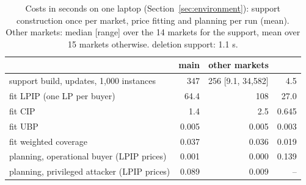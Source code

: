 
\begin{table}[t]
  \centering
  \footnotesize
  \setlength{\tabcolsep}{3pt}
  \caption{Costs in seconds on one laptop (Section~\ref{sec:environment}): support construction once per market, price fitting and planning per run (mean). Other markets: median [range] over the 14 markets for the support, mean over 15 markets otherwise. \tpch{} deletion support: 1.1 s.}
  \label{tab:costs}
  \begin{tabular}{@{}p{}rrr@{}}
    \toprule
    & main & other markets & \tpch{} \\
    \midrule
    support build, \qirana{} updates, 1,000 instances & 347 & 256 [9.1, 34,582] & 4.5 \\
    fit LPIP (one LP per buyer) & 64.4 & 108 & 27.0 \\
    fit CIP & 1.4 & 2.5 & 0.645 \\
    fit UBP & 0.005 & 0.005 & 0.003 \\
    fit \qirana{} weighted coverage & 0.037 & 0.036 & 0.019 \\
    planning, operational buyer (LPIP prices) & 0.001 & 0.000 & 0.139 \\
    planning, privileged attacker (LPIP prices) & 0.089 & 0.009 & -- \\
    \bottomrule
  \end{tabular}
\end{table}

